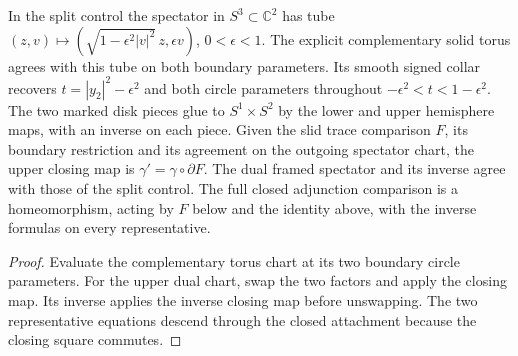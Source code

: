 \begin{proposition}
\label{prop:ed03-closed-slide-control}
\leanok
In the split control the spectator in $S^3\subset\mathbb C^2$ has tube
$(z,v)\mapsto (\sqrt{1-\epsilon^2|v|^2}\,z,\epsilon v)$,
$0<\epsilon<1$. The explicit complementary solid torus agrees with
this tube on both boundary parameters. Its smooth signed collar recovers $t=|y_2|^2-\epsilon^2$ and both circle parameters throughout $-\epsilon^2<t<1-\epsilon^2$. The two marked disk pieces glue to $S^1\times S^2$ by the lower and upper hemisphere maps, with an inverse on each piece. Given the slid trace comparison
$F$, its boundary restriction and its agreement on the outgoing
spectator chart, the upper closing map is $\gamma'=\gamma\circ\partial F$.
The dual framed spectator and its inverse agree with those of the split
control. The full closed adjunction comparison is a homeomorphism,
acting by $F$ below and the identity above, with the inverse formulas
on every representative.
\end{proposition}
\begin{proof}
\leanok
Evaluate the complementary torus chart at its two boundary circle
parameters. For the upper dual chart, swap the two factors and apply
the closing map. Its inverse applies the inverse closing map before
unswapping. The two representative equations descend through the
closed attachment because the closing square commutes.
\end{proof}


